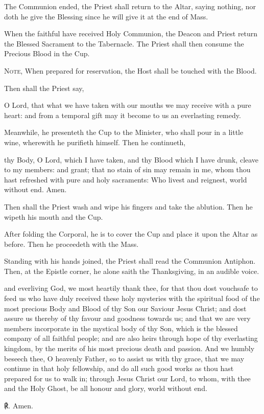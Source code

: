 \begin{rubric}
    The Communion ended, the Priest shall return to the Altar, saying nothing, nor doth he give the Blessing since he will give it at the end of Mass.    
\end{rubric}
\begin{rubric}
    When the faithful have received Holy Communion, the Deacon and Priest return the Blessed Sacrament to the Tabernacle. The Priest shall then consume the Precious Blood in the Cup.\par
    \textsc{Note,} When prepared for reservation, the Host shall be touched with the Blood.
\end{rubric}
\begin{rubric}
    Then shall the Priest say,
\end{rubric}
 O Lord, that what we have taken with our mouths we may receive with a pure heart: and from a temporal gift may it become to us an everlasting remedy.
\begin{rubric}
    Meanwhile, he presenteth the Cup to the Minister, who shall pour in a little wine, wherewith he purifieth himself. Then he continueth,    
\end{rubric}
 thy Body, O Lord, which I have taken, and thy Blood which I have drunk, cleave to my members: and grant; that no stain of sin may remain in me, whom thou hast refreshed with pure and holy sacraments: Who livest and reignest, world without end. Amen.
\begin{rubric}
    Then shall the Priest wash and wipe his fingers and take the ablution. Then he wipeth his mouth and the Cup.
\end{rubric}
\begin{rubric}
	After folding the Corporal, he is to cover the Cup and place it upon the Altar as before. Then he proceedeth with the Mass.
\end{rubric}
\begin{rubric}
    Standing with his hands joined, the Priest shall read the Communion Antiphon. Then, at the Epistle corner, he alone saith the Thanksgiving, in an audible voice.
\end{rubric}
{} and everliving God, we most heartily thank thee, for that thou dost vouchsafe to feed us who have duly received these holy mysteries with the spiritual food of the most precious Body and Blood of thy Son our Saviour Jesus Christ; and dost assure us thereby of thy favour and goodness towards us; and that we are very members incorporate in the mystical body of thy Son, which is the blessed company of all faithful people; and are also heirs through hope of thy everlasting kingdom, by the merits of his most precious death and passion. And we humbly beseech thee, O heavenly Father, so to assist us with thy grace, that we may continue in that holy fellowship, and do all such good works as thou hast prepared for us to walk in; through Jesus Christ our Lord, to whom, with thee and the Holy Ghost, be all honour and glory, world without end.\par
℟. Amen.

